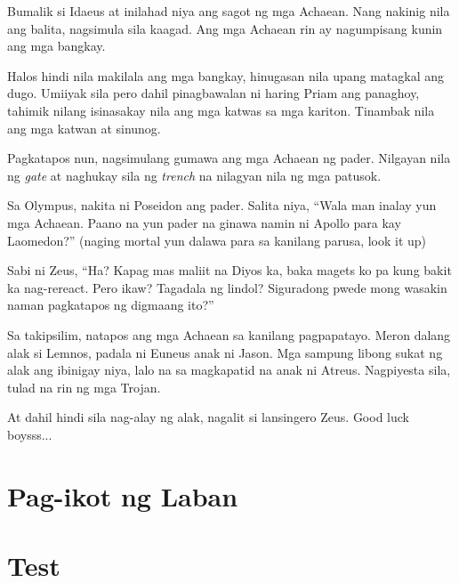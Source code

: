 \documentclass[12pt,letterpaper]{report}
\begin{document}
Bumalik si Idaeus at inilahad niya ang sagot ng mga Achaean. Nang nakinig nila ang balita, nagsimula sila kaagad. Ang mga Achaean rin ay nagumpisang kunin ang mga bangkay.

Halos hindi nila makilala ang mga bangkay, hinugasan nila upang matagkal ang dugo. Umiiyak sila pero dahil pinagbawalan ni haring Priam ang panaghoy, tahimik nilang isinasakay nila ang mga katwas sa mga kariton. Tinambak nila ang mga katwan at sinunog.

Pagkatapos nun, nagsimulang gumawa ang mga Achaean ng pader. Nilgayan nila ng \textit{gate} at naghukay sila ng \textit{trench} na nilagyan nila ng mga patusok.

Sa Olympus, nakita ni Poseidon ang pader. Salita niya, ``Wala man inalay yun mga Achaean. Paano na yun pader na ginawa namin ni Apollo para kay Laomedon?'' (naging mortal yun dalawa para sa kanilang parusa, look it up)

Sabi ni Zeus, ``Ha? Kapag mas maliit na Diyos ka, baka magets ko pa kung bakit ka nag-rereact. Pero ikaw? Tagadala ng lindol? Siguradong pwede mong wasakin naman pagkatapos ng digmaang ito?''

Sa takipsilim, natapos ang mga Achaean sa kanilang pagpapatayo. Meron dalang alak si Lemnos, padala ni Euneus anak ni Jason. Mga sampung libong sukat ng alak ang ibinigay niya, lalo na sa magkapatid na anak ni Atreus. Nagpiyesta sila, tulad na rin ng mga Trojan.

At dahil hindi sila nag-alay ng alak, nagalit si lansingero Zeus. Good luck boysss... \pagebreak
\chapter{Pag-ikot ng Laban}
\pagebreak
\chapter{Test}
\end{document}
